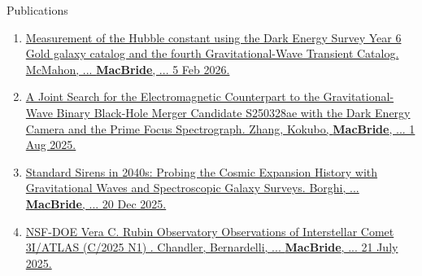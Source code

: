 \documentclass{resume} %
\begin{document}
\begin{rSection}{Publications}
\begin{enumerate}
    \item \href{https://arxiv.org/pdf/2602.04766}{Measurement of the Hubble constant using the Dark Energy Survey Year 6 Gold galaxy catalog and the fourth Gravitational-Wave Transient Catalog. McMahon, ... \textbf{MacBride}, ...  5 Feb 2026.} 
    \item \href{https://arxiv.org/abs/2508.00291}{A Joint Search for the Electromagnetic Counterpart to the Gravitational-Wave Binary Black-Hole Merger Candidate S250328ae with the Dark Energy Camera and the Prime Focus Spectrograph. Zhang, Kokubo, \textbf{MacBride}, ... 1 Aug 2025.} 
    \item \href{https://arxiv.org/pdf/2512.18369}{Standard Sirens in 2040s: Probing the Cosmic Expansion History with Gravitational Waves and Spectroscopic Galaxy Surveys. Borghi, ... \textbf{MacBride}, ... 20 Dec 2025.} 
    
    

    \item \href{https://arxiv.org/pdf/2507.13409}{NSF-DOE Vera C. Rubin Observatory Observations of Interstellar Comet 3I/ATLAS (C/2025 N1) . Chandler, Bernardelli, ... \textbf{MacBride}, ... 21 July 2025.} 


\end{enumerate}
\end{rSection}
\end{document}
